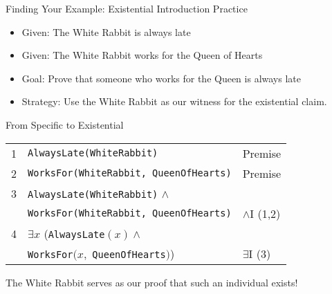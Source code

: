 \documentclass{beamer}
\begin{document}
	\begin{frame}{Finding Your Example: Existential Introduction Practice}
		\begin{itemize}
			\item Given: The White Rabbit is always late
			\item Given: The White Rabbit works for the Queen of Hearts
			\item Goal: Prove that someone who works for the Queen is always late
			\item Strategy: Use the White Rabbit as our witness for the existential claim.
		\end{itemize}
		
		\begin{block}{From Specific to Existential}
			\begin{tabular}{|c|l|l|}
				\hline
				1 & \texttt{AlwaysLate(WhiteRabbit)} & Premise \\
				2 & \texttt{WorksFor(WhiteRabbit, QueenOfHearts)} & Premise \\
				3 & \texttt{AlwaysLate(WhiteRabbit)} $\land$ & \\
				& \texttt{WorksFor(WhiteRabbit, QueenOfHearts)} & $\land$I (1,2) \\
				4 & $\exists x$ (\texttt{AlwaysLate}$(x) \land$ & \\
				& \texttt{WorksFor}$(x,$ \texttt{QueenOfHearts}$)$) & $\exists$I (3) \\
				\hline
			\end{tabular}
			
			The White Rabbit serves as our proof that such an individual exists!
		\end{block}
	\end{frame}
	
\end{document}
